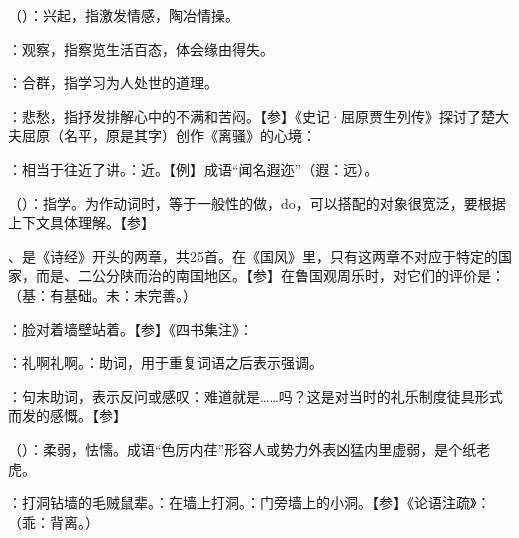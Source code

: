 {
\item {}（）：兴起，指激发情感，陶冶情操。
\item {}：观察，指察览生活百态，体会缘由得失。
\item {}：合群，指学习为人处世的道理。
\item {}：悲愁，指抒发排解心中的不满和苦闷。【参】《史记·屈原贾生列传》探讨了楚大夫屈原（名平，原是其字）创作《离骚》的心境：
\item {}：相当于往近了讲。：近。【例】成语“闻名遐迩”（遐：远）。
}
{}


{
\item {}（）：指学。为作动词时，等于一般性的做，do，可以搭配的对象很宽泛，要根据上下文具体理解。【参】
\item {}、是《诗经》开头的两章，共25首。在《国风》里，只有这两章不对应于特定的国家，而是、二公分陕而治的南国地区。【参】在鲁国观周乐时，对它们的评价是：（基：有基础。未：未完善。）
\item {}：脸对着墙壁站着。【参】《四书集注》：
}
{}


{
\item {}：礼啊礼啊。：助词，用于重复词语之后表示强调。
\item {}：句末助词，表示反问或感叹：难道就是……吗？这是对当时的礼乐制度徒具形式而发的感慨。【参】
}
{}  %


{
\item {}（）：柔弱，怯懦。成语“色厉内荏”形容人或势力外表凶猛内里虚弱，是个纸老虎。
\item {}：打洞钻墙的毛贼鼠辈。：在墙上打洞。：门旁墙上的小洞。【参】《论语注疏》：（乖：背离。）%
}
{}


